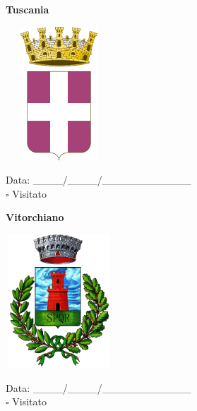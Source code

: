 \documentclass[a5paper,12pt]{article}
\begin{document}
\vspace{0.7cm}

\noindent
\begin{minipage}[t]{0.45\textwidth}
    \begin{center}
        \textbf{Tuscania}
    \end{center}
    \vspace{-0.5cm} %
    \begin{center}
        \includegraphics[height= 5cm, width=4cm]{Lazio/Stemma Tuscania.png}
    \end{center}
    \vspace{-0.4cm} %
    \begin{flushleft}
        Data: \_\_\_\_/\_\_\_\_/\_\_\_\_\_\_\_\_\_\_\_\_ \\
        $\square$ Visitato
    \end{flushleft}
\end{minipage}
\hfill
\noindent
\begin{minipage}[t]{0.45\textwidth}
    \begin{center}
        \textbf{Vitorchiano}
    \end{center}
    \vspace{-0.5cm} %
    \begin{center}
        \includegraphics[height= 5cm, width=4cm]{Lazio/Stemma Vitorchiano.png}
    \end{center}
    \vspace{-0.4cm} %
    \begin{flushleft}
        Data: \_\_\_\_/\_\_\_\_/\_\_\_\_\_\_\_\_\_\_\_\_ \\
        $\square$ Visitato
    \end{flushleft}
\end{minipage}
\hfill
\end{document}

